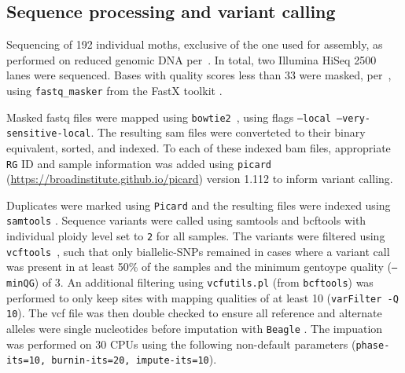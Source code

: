 \documentclass[fleqn,11pt]{wlpeerj}
\begin{document}
\subsection*{Sequence processing and variant calling} Sequencing of 192
individual moths, exclusive of the one used for assembly,  as performed on
reduced genomic DNA per~\cite{PARCHMAN:2012ca}. In total, two  Illumina HiSeq
2500 lanes were sequenced. Bases with quality scores less than 33 were masked,
per~\cite{Yun:2014dn},  using \texttt{fastq\_masker} from the FastX toolkit
\citep[][version 0.0.14]{citeulike:9103573}.

Masked fastq files were mapped using \texttt{bowtie2}~\citep[][version
2.2.4]{Langmead:2012jh}, using flags  \texttt{--local
--very-sensitive-local}.  The resulting  sam files were converteted to their
binary equivalent, sorted, and indexed. To each of these indexed bam files,
appropriate \texttt{RG} ID and sample information was added using
\texttt{picard} \\ (\url{https://broadinstitute.github.io/picard}) version 1.112
to inform variant calling.

Duplicates were marked using \texttt{Picard} and the resulting files were
indexed using \texttt{samtools} \citep[][version 1.2]{Li:2009ka}.  Sequence
variants were called using samtools and bcftools \citep[][version
1.2]{Li:2009ka} with individual  ploidy level set to \texttt{2} for all samples.
The variants were filtered  using \texttt{vcftools}~\citep[][version
0.1.14]{Danecek:2011gz}, such that only biallelic-SNPs remained in cases where a
variant call was present in at least 50\% of the samples and the minimum
gentoype quality (\texttt{--minQG}) of 3. An additional filtering using
\texttt{vcfutils.pl} (from \texttt{bcftools}) was performed to only keep sites
with mapping qualities of at least 10 (\texttt{varFilter -Q 10}). The vcf file
was then double checked to ensure all reference and alternate alleles were
single nucleotides before imputation with \texttt{Beagle}
\citep[][version 4.0]{Browning:2007ge}.  The impuation was performed on 30 CPUs
using the following non-default parameters (\texttt{phase-its=10, burnin-its=20,
impute-its=10}).
\end{document}
